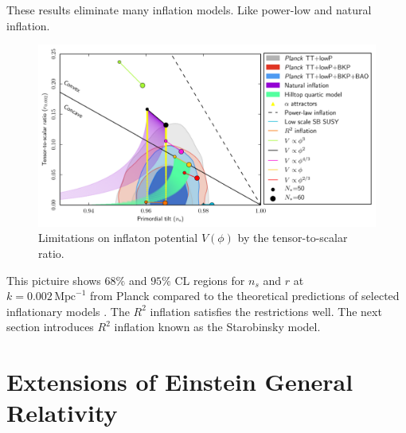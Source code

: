\documentclass[12pt]{article}
\numberwithin{equation}{section}
\begin{document}
\noindent These results eliminate many inflation models. Like power-low and natural inflation.
\begin{figure}[H]
    \centering
    \includegraphics[width=13.7cm]{BKP_120mmR.pdf}
    \caption{Limitations on inflaton potential $V(\phi)$ by the tensor-to-scalar ratio.}\label{fig:Planck}
\end{figure}
This pictuire shows $68\%$ and $95\%$ CL regions for $n_s$ and $r$ at\\
 $k = 0.002 \,\textrm{Mpc}^{-1}$ from Planck compared to the theoretical predictions of selected inflationary models \cite{Planck:2015sxf}. The $R^2$ inflation satisfies the restrictions well. The next section introduces $R^2$ inflation known as the Starobinsky model.

\section{Extensions of Einstein General Relativity}
\end{document}

